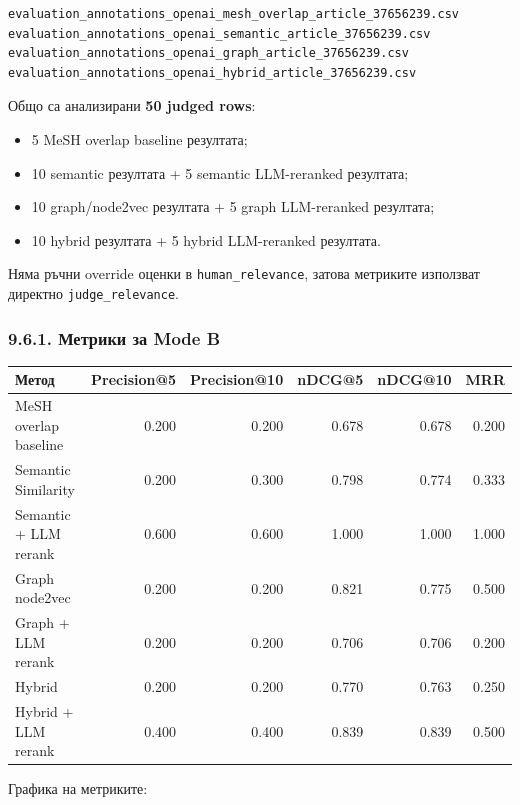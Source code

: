 \documentclass[12pt,a4paper]{article}
\providecommand{\tightlist}{\setlength{\itemsep}{0pt}\setlength{\parskip}{0pt}}
\begin{document}
\begin{verbatim}
evaluation_annotations_openai_mesh_overlap_article_37656239.csv
evaluation_annotations_openai_semantic_article_37656239.csv
evaluation_annotations_openai_graph_article_37656239.csv
evaluation_annotations_openai_hybrid_article_37656239.csv
\end{verbatim}

Общо са анализирани \textbf{50 judged rows}:

\begin{itemize}
\tightlist
\item
  5 MeSH overlap baseline резултата;
\item
  10 semantic резултата + 5 semantic LLM-reranked резултата;
\item
  10 graph/node2vec резултата + 5 graph LLM-reranked резултата;
\item
  10 hybrid резултата + 5 hybrid LLM-reranked резултата.
\end{itemize}

Няма ръчни override оценки в \texttt{human\_relevance}, затова метриките използват директно \texttt{judge\_relevance}.

\subsubsection{9.6.1. Метрики за Mode B}\label{ux43cux435ux442ux440ux438ux43aux438-ux437ux430-mode-b}

\begin{longtable}[]{@{}lrrrrr@{}}
\toprule\noalign{}
Метод & Precision@5 & Precision@10 & nDCG@5 & nDCG@10 & MRR \\
\midrule\noalign{}
\endhead
\bottomrule\noalign{}
\endlastfoot
MeSH overlap baseline & 0.200 & 0.200 & 0.678 & 0.678 & 0.200 \\
Semantic Similarity & 0.200 & 0.300 & 0.798 & 0.774 & 0.333 \\
Semantic + LLM rerank & 0.600 & 0.600 & 1.000 & 1.000 & 1.000 \\
Graph node2vec & 0.200 & 0.200 & 0.821 & 0.775 & 0.500 \\
Graph + LLM rerank & 0.200 & 0.200 & 0.706 & 0.706 & 0.200 \\
Hybrid & 0.200 & 0.200 & 0.770 & 0.763 & 0.250 \\
Hybrid + LLM rerank & 0.400 & 0.400 & 0.839 & 0.839 & 0.500 \\
\end{longtable}

Графика на метриките:
\end{document}
